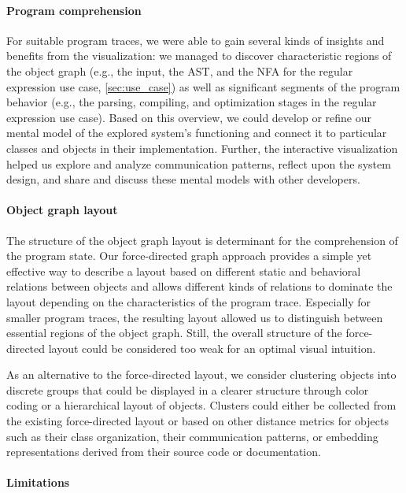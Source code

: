\paragraph{Program comprehension}

For suitable program traces, we were able to gain several kinds of insights and benefits from the visualization:
we managed to discover characteristic regions of the object graph (e.g., the input, the AST, and the NFA for the regular expression use case, \cref{sec:use_case}) as well as significant segments of the program behavior (e.g., the parsing, compiling, and optimization stages in the regular expression use case).
Based on this overview, we could develop or refine our mental model of the explored system's functioning and connect it to particular classes and objects in their implementation.
Further, the interactive visualization helped us explore and analyze communication patterns, reflect upon the system design, and share and discuss these mental models with other developers.

\paragraph{Object graph layout}

The structure of the object graph layout is determinant for the comprehension of the program state.
Our force-directed graph approach provides a simple yet effective way to describe a layout based on different static and behavioral relations between objects and allows different kinds of relations to dominate the layout depending on the characteristics of the program trace.
Especially for smaller program traces, the resulting layout allowed us to distinguish between essential regions of the object graph.
Still, the overall structure of the force-directed layout could be considered too weak for an optimal visual intuition.

As an alternative to the force-directed layout, we consider clustering objects into discrete groups that could be displayed in a clearer structure through color coding or a hierarchical layout of objects.
Clusters could either be collected from the existing force-directed layout or based on other distance metrics for objects such as their class organization, their communication patterns, or embedding representations derived from their source code or documentation.

\paragraph{Limitations}

